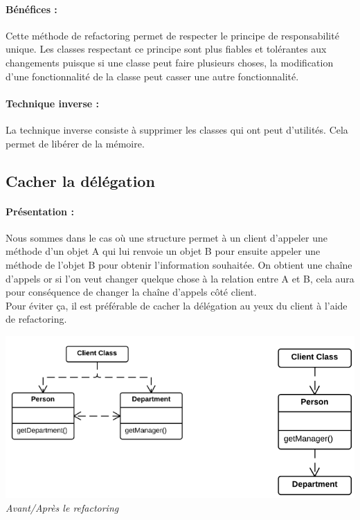 \documentclass[a4paper,twoside,12pt,openright]{report}
\begin{document}
\paragraph{Bénéfices :}
Cette méthode de refactoring permet de respecter le principe de responsabilité unique.
Les classes respectant ce principe sont plus fiables et tolérantes aux changements puisque si une classe peut faire plusieurs choses, la modification d'une fonctionnalité de la classe peut casser une autre fonctionnalité.

\paragraph{Technique inverse :}
La technique inverse consiste à supprimer les classes qui ont peut d'utilités. Cela permet de libérer de la mémoire.\\

\subsection{Cacher la délégation}
\paragraph{Présentation :}
Nous sommes dans le cas où une structure permet à un client d'appeler une méthode d'un objet A qui lui renvoie un objet B pour ensuite appeler une méthode de l'objet B pour obtenir l'information souhaitée. On obtient une chaîne d'appels or si l'on veut changer quelque chose à la relation entre A et B, cela aura pour conséquence de changer la chaîne d'appels côté client.\\
Pour éviter ça, il est préférable de cacher la délégation au yeux du client à l'aide de refactoring.

\begin{center}
\includegraphics[scale=0.7]{Image/Cacher_Delegation.png}\\
\itshape{Avant/Après le refactoring \cite{ref5}}
\end{center}
\end{document}
